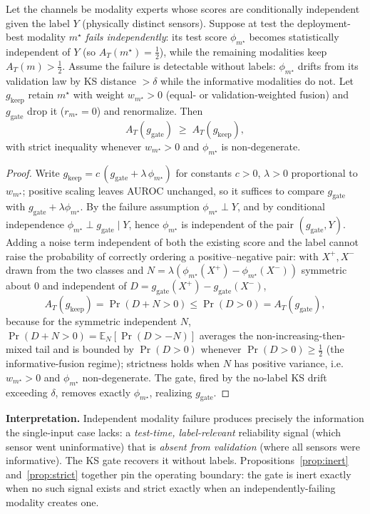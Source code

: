 \begin{proposition}
\label{prop:strict}
Let the channels be modality experts whose scores are conditionally independent given the
label $Y$ (physically distinct sensors). Suppose at test the deployment-best modality
$m^\star$ \emph{fails independently}: its test score $\phi_{m^\star}$ becomes statistically
independent of $Y$ (so $A_T(m^\star)=\tfrac12$), while the remaining modalities keep
$A_T(m)>\tfrac12$. Assume the failure is detectable without labels: $\phi_{m^\star}$ drifts
from its validation law by KS distance $>\delta$ while the informative modalities do not.
Let $g_{\mathrm{keep}}$ retain $m^\star$ with weight $w_{m^\star}>0$ (equal- or
validation-weighted fusion) and $g_{\mathrm{gate}}$ drop it ($r_{m^\star}=0$) and
renormalize. Then
\[
A_T\!\left(g_{\mathrm{gate}}\right)\;\ge\;A_T\!\left(g_{\mathrm{keep}}\right),
\]
with strict inequality whenever $w_{m^\star}>0$ and $\phi_{m^\star}$ is non-degenerate.
\end{proposition}
\begin{proof}
Write $g_{\mathrm{keep}}=c\,(g_{\mathrm{gate}}+\lambda\,\phi_{m^\star})$ for constants
$c>0$, $\lambda>0$ proportional to $w_{m^\star}$; positive scaling leaves AUROC unchanged,
so it suffices to compare $g_{\mathrm{gate}}$ with $g_{\mathrm{gate}}+\lambda\phi_{m^\star}$.
By the failure assumption $\phi_{m^\star}\perp Y$, and by conditional independence
$\phi_{m^\star}\perp g_{\mathrm{gate}}\mid Y$, hence $\phi_{m^\star}$ is independent of the
pair $(g_{\mathrm{gate}},Y)$. Adding a noise term independent of both the existing score
and the label cannot raise the probability of correctly ordering a positive--negative pair:
with $X^+,X^-$ drawn from the two classes and $N=\lambda(\phi_{m^\star}(X^+)-\phi_{m^\star}(X^-))$
symmetric about $0$ and independent of $D=g_{\mathrm{gate}}(X^+)-g_{\mathrm{gate}}(X^-)$,
\[
A_T(g_{\mathrm{keep}})=\Pr(D+N>0)\le \Pr(D>0)=A_T(g_{\mathrm{gate}}),
\]
because for the symmetric independent $N$, $\Pr(D+N>0)=\mathbb{E}_N[\Pr(D>-N)]$ averages the
non-increasing-then-mixed tail and is bounded by $\Pr(D>0)$ whenever $\Pr(D>0)\ge\tfrac12$
(the informative-fusion regime); strictness holds when $N$ has positive variance, i.e.\
$w_{m^\star}>0$ and $\phi_{m^\star}$ non-degenerate. The gate, fired by the no-label KS
drift exceeding $\delta$, removes exactly $\phi_{m^\star}$, realizing $g_{\mathrm{gate}}$.
\end{proof}
\noindent\textbf{Interpretation.} Independent modality failure produces precisely the
information the single-input case lacks: a \emph{test-time, label-relevant} reliability
signal (which sensor went uninformative) that is \emph{absent from validation} (where all
sensors were informative). The KS gate recovers it without labels. Propositions~\ref{prop:inert}
and~\ref{prop:strict} together pin the operating boundary: the gate is inert exactly when
no such signal exists and strict exactly when an independently-failing modality creates one.

